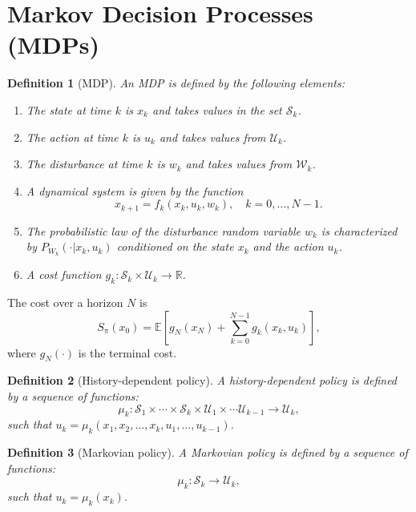 \documentclass[a4 paper]{article}
\numberwithin{equation}{section}
\theoremstyle{boldStyle}
\theoremstyle{boldBlueStyle}
\theoremstyle{boldPurpleStyle}
\theoremstyle{boldRedStyle}
\newtheorem{definition}{Definition}[section]
\theoremstyle{boldGreenStyle}
\begin{document}
\section{Markov Decision Processes (MDPs)}

\begin{definition}[MDP]
  An MDP is defined by the following elements:
  \begin{enumerate}
    \item The state at time \( k \) is \( x_k \) and takes values in the set \( \mathcal{S}_k \).
    \item The action at time \( k \) is \( u_k \) and takes values from \( \mathcal{U}_k \).
    \item The disturbance at time \( k \) is \( w_k \) and takes values from \( \mathcal{W}_k \).
    \item A dynamical system is given by the function
      \begin{equation}
        x_{k+1} = f_k(x_k, u_k, w_k), \quad k = 0, \ldots, N-1.
      \end{equation}
    \item The probabilistic law of the disturbance random variable \( w_k \) is characterized by \( P_{W_k}(\cdot | x_k, u_k) \) conditioned on the state \( x_k \) and the action \( u_k \).
    \item A cost function \( g_k : \mathcal{S}_k \times \mathcal{U}_k \to \mathbb{R} \).
  \end{enumerate}
\end{definition}

The cost over a horizon \( N \) is
\begin{equation}
  S_\pi(x_0) = \mathbb{E}[g_N(x_N) + \sum_{k=0}^{N-1} g_k(x_k, u_k)],
\end{equation}
where \( g_N(\cdot) \) is the terminal cost.

\begin{definition}[History-dependent policy]
  A history-dependent policy is defined by a sequence of functions:
  \begin{equation}
    \mu_k : \mathcal{S}_1 \times \cdots \times \mathcal{S}_k \times \mathcal{U}_1 \times \cdots \mathcal{U}_{k-1} \to \mathcal{U}_k,
  \end{equation}
  such that \( u_k = \mu_k(x_1, x_2, \ldots, x_k, u_1, \ldots, u_{k-1}) \).
\end{definition}

\begin{definition}[Markovian policy]
  A Markovian policy is defined by a sequence of functions:
  \begin{equation}
    \mu_k : \mathcal{S}_k \to \mathcal{U}_k,
  \end{equation}
  such that \( u_k = \mu_k(x_k) \).
\end{definition}
\end{document}
